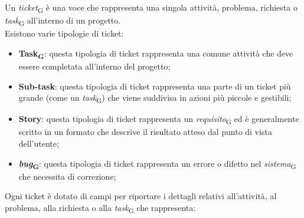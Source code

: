 Un \textit{ticket}\textsubscript{G} è una voce che rappresenta una singola attività, problema, richiesta o \textit{task}\textsubscript{G} all'interno di un progetto. \\
Esistono varie tipologie di ticket:
\begin{itemize}
    \item \textbf{Task\textsubscript{G}}: questa tipologia di ticket rappresenta una comune attività che deve essere completata all'interno del progetto;
    \item \textbf{Sub-task}: questa tipologia di ticket rappresenta una parte di un ticket più grande (come un \textit{task}\textsubscript{G}) che viene suddivisa in azioni più piccole e gestibili;
    \item \textbf{Story}: questa tipologia di ticket rappresenta un \textit{requisito}\textsubscript{G} ed è generalmente scritto in un formato che descrive il risultato atteso dal punto di vista dell'utente;
    \item \textbf{\textit{bug}\textsubscript{G}}: questa tipologia di ticket rappresenta un errore o difetto nel \textit{sistema}\textsubscript{G} che necessita di correzione;
\end{itemize}
Ogni ticket è dotato di campi per riportare i dettagli relativi all'attività, al problema, alla richiesta o alla \textit{task}\textsubscript{G} che rappresenta:
